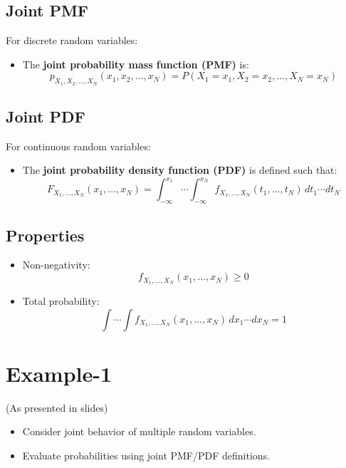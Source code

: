 \documentclass[11pt]{article}
\begin{document}
\subsection{Joint PMF}

For discrete random variables:

\begin{itemize}
    \item The \textbf{joint probability mass function (PMF)} is:
    \[
    p_{X_1, X_2, \dots, X_N}(x_1, x_2, \dots, x_N)
    = P(X_1 = x_1, X_2 = x_2, \dots, X_N = x_N)
    \]
\end{itemize}

\subsection{Joint PDF}

For continuous random variables:

\begin{itemize}
    \item The \textbf{joint probability density function (PDF)} is defined such that:
    \[
    F_{X_1, \dots, X_N}(x_1, \dots, x_N)
    = \int_{-\infty}^{x_1} \cdots \int_{-\infty}^{x_N}
    f_{X_1, \dots, X_N}(t_1, \dots, t_N)\, dt_1 \cdots dt_N
    \]
\end{itemize}

\subsection{Properties}

\begin{itemize}
    \item Non-negativity:
    \[
    f_{X_1, \dots, X_N}(x_1, \dots, x_N) \ge 0
    \]
    
    \item Total probability:
    \[
    \int \cdots \int f_{X_1, \dots, X_N}(x_1, \dots, x_N)\, dx_1 \cdots dx_N = 1
    \]
\end{itemize}

\section{Example-1}

(As presented in slides)

\begin{itemize}
    \item Consider joint behavior of multiple random variables.
    \item Evaluate probabilities using joint PMF/PDF definitions.
\end{itemize}
\end{document}
